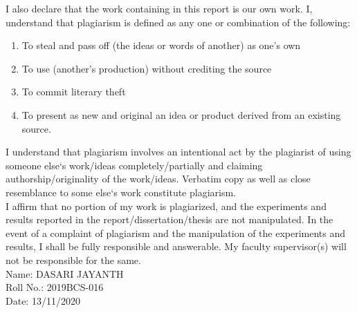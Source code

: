 \documentclass[12pt]{article}
\begin{document}
\noindent I also declare that the work containing in this report is our own work. I, understand that plagiarism is defined as any one or combination of the following:
\begin{enumerate}
\item To steal and pass off (the ideas or words of another) as one's own
\item To use (another's production) without crediting the source
\item To commit literary theft
\item To present as new and original an idea or product derived from an existing source.
\end{enumerate}
I understand that plagiarism involves an intentional act by the plagiarist of using someone else`s work/ideas completely/partially and claiming authorship/originality of the work/ideas. Verbatim copy as well as close resemblance to some else`s work constitute plagiarism.\\


\noindent I affirm that no portion of my work is plagiarized, and the experiments and results reported in the report/dissertation/thesis are not manipulated. In the event of a complaint of plagiarism and the manipulation of the experiments and results, I shall be fully responsible and answerable. My faculty supervisor(s) will not be responsible for the same.\vspace{1cm}\\

Name: DASARI JAYANTH \\
Roll No.: 2019BCS-016  \\
Date: 13/11/2020   \\
\end{document}

